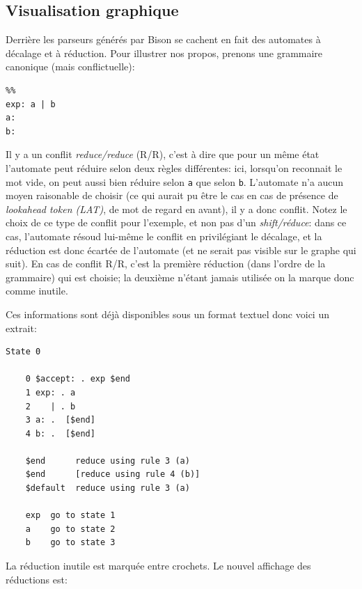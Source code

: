 \documentclass[a4paper,11pt,twoside,final]{article}
\begin{document}
  \cleardoublepage

  \subsection{Visualisation graphique}

  Derrière les parseurs générés par Bison se cachent en fait des automates à
  décalage et à réduction. Pour illustrer nos propos, prenons une grammaire
  canonique (mais conflictuelle):

  \begin{verbatim}
%%
exp: a | b
a:
b:
  \end{verbatim}

  Il y a un conflit \textit{reduce/reduce} (R/R), c'est à dire que pour un même état
  l'automate peut réduire selon deux règles différentes: ici, lorsqu'on
  reconnait le mot vide, on peut aussi bien réduire selon \texttt{a} que selon
  \texttt{b}. L'automate n'a aucun moyen raisonable de choisir (ce qui aurait
  pu être le cas en cas de présence de \textit{lookahead token (LAT)}, de mot de
  regard en avant), il y a donc conflit. Notez le choix de ce type de conflit
  pour l'exemple, et non pas d'un \textit{shift/réduce}: dans ce cas,
  l'automate résoud lui-même le conflit en privilégiant le décalage, et la
  réduction est donc écartée de l'automate (et ne serait pas visible sur le
  graphe qui suit). En cas de conflit R/R, c'est la première réduction (dans
  l'ordre de la grammaire) qui est choisie; la deuxième n'étant jamais utilisée
  on la marque donc comme inutile.

  Ces informations sont déjà disponibles sous un format textuel donc voici un
  extrait:

  \begin{verbatim}
State 0

    0 $accept: . exp $end
    1 exp: . a
    2    | . b
    3 a: .  [$end]
    4 b: .  [$end]

    $end      reduce using rule 3 (a)
    $end      [reduce using rule 4 (b)]
    $default  reduce using rule 3 (a)

    exp  go to state 1
    a    go to state 2
    b    go to state 3
    \end{verbatim}

    La réduction inutile est marquée entre crochets. Le nouvel affichage des
    réductions est:
\end{document}
